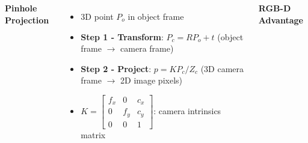 \documentclass[serif, aspectratio=169, 9pt]{beamer}
\begin{document}
\begin{frame}
\begin{columns}
        \vspace{0.3em}
        \textbf{Pinhole Projection}
        \begin{itemize}
            \item 3D point $P_o$ in object frame
            \item \textbf{Step 1 - Transform}: $P_c = R P_o + t$ (object frame $\to$ camera frame)
            \item \textbf{Step 2 - Project}: $p = K P_c / Z_c$ (3D camera frame $\to$ 2D image pixels)
            \item $K = \begin{bmatrix} f_x & 0 & c_x \\ 0 & f_y & c_y \\ 0 & 0 & 1 \end{bmatrix}$: camera intrinsics matrix
        \end{itemize}
        \vspace{0.3em}
        \textbf{RGB-D Advantage}

\end{columns}
\end{frame}
\end{document}

